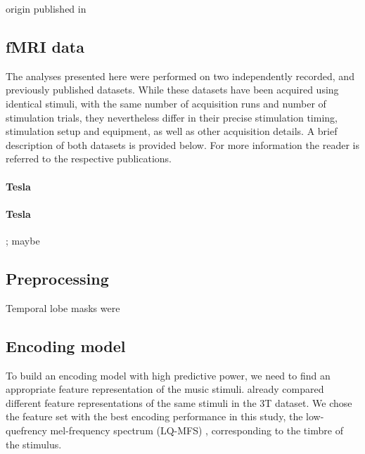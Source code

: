 origin \citet{CTK+2012}
published in \citet{HDH+2015}

\subsection*{fMRI data}

The analyses presented here were performed on two independently recorded,
and previously published datasets. While these datasets have been acquired
using identical stimuli, with the same number of acquisition runs and
number of stimulation trials, they nevertheless differ in their precise
stimulation timing, stimulation setup and equipment, as well as other
acquisition details. A brief description of both datasets is provided below.
For more information the reader is referred to the respective publications.

\paragraph{\unit[3]{Tesla}}
%

\paragraph{\unit[7]{Tesla}}
%
\citet{HDH+2015}; maybe \citet{HBI+14}


\subsection*{Preprocessing}

Temporal lobe masks were 

\subsection*{Encoding model}


To build an encoding model with high predictive power, we need to find an
appropriate feature representation of the music stimuli.  \citet{CTK+2012}
already compared different feature representations of the same stimuli in the
3T dataset. We chose the feature set with the best encoding performance in this
study, the low-quefrency mel-frequency spectrum (LQ-MFS) \citep{HDH+2015},
corresponding to the timbre of the stimulus. 


